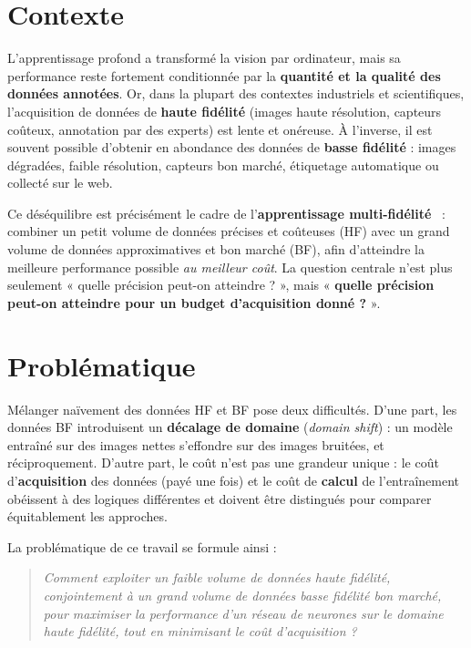 \documentclass[11pt,a4paper,openany]{book}
\begin{document}
\section{Contexte}

L'apprentissage profond a transformé la vision par ordinateur, mais sa performance reste fortement conditionnée par la \textbf{quantité et la qualité des données annotées}. Or, dans la plupart des contextes industriels et scientifiques, l'acquisition de données de \textbf{haute fidélité} (images haute résolution, capteurs coûteux, annotation par des experts) est lente et onéreuse. À l'inverse, il est souvent possible d'obtenir en abondance des données de \textbf{basse fidélité} : images dégradées, faible résolution, capteurs bon marché, étiquetage automatique ou collecté sur le web.

Ce déséquilibre est précisément le cadre de l'\textbf{apprentissage multi-fidélité}~\cite{kennedy2000,multifidelity} : combiner un petit volume de données précises et coûteuses (HF) avec un grand volume de données approximatives et bon marché (BF), afin d'atteindre la meilleure performance possible \emph{au meilleur coût}. La question centrale n'est plus seulement « quelle précision peut-on atteindre ? », mais « \textbf{quelle précision peut-on atteindre pour un budget d'acquisition donné ?} ».

\section{Problématique}

Mélanger naïvement des données HF et BF pose deux difficultés. D'une part, les données BF introduisent un \textbf{décalage de domaine} (\textit{domain shift}) : un modèle entraîné sur des images nettes s'effondre sur des images bruitées, et réciproquement. D'autre part, le coût n'est pas une grandeur unique : le coût d'\textbf{acquisition} des données (payé une fois) et le coût de \textbf{calcul} de l'entraînement obéissent à des logiques différentes et doivent être distingués pour comparer équitablement les approches.

La problématique de ce travail se formule ainsi :

\begin{quote}
\itshape Comment exploiter un faible volume de données haute fidélité, conjointement à un grand volume de données basse fidélité bon marché, pour maximiser la performance d'un réseau de neurones sur le domaine haute fidélité, tout en minimisant le coût d'acquisition ?
\end{quote}
\end{document}
